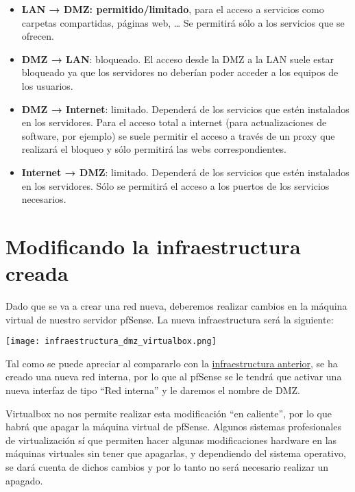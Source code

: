 \begin{itemize}
    \item \textbf{LAN → DMZ: permitido/limitado}, para el acceso a servicios como carpetas compartidas, páginas web, … Se permitirá sólo a los servicios que se ofrecen.
    \item  \textbf{DMZ → LAN}: bloqueado. El acceso desde la DMZ a la LAN suele estar bloqueado ya que los servidores no deberían poder acceder a los equipos de los usuarios.
    \item \textbf{DMZ → Internet}: limitado. Dependerá de los servicios que estén instalados en los servidores. Para el acceso total a internet (para actualizaciones de software, por ejemplo) se suele permitir el acceso a través de un proxy que realizará el bloqueo y sólo permitirá las webs correspondientes.
    \item \textbf{Internet → DMZ}: limitado. Dependerá de los servicios que estén instalados en los servidores. Sólo se permitirá el acceso a los puertos de los servicios necesarios.
\end{itemize}

\section{Modificando la infraestructura creada}

Dado que se va a crear una red nueva, deberemos realizar cambios en la máquina virtual de nuestro servidor pfSense. La nueva infraestructura será la siguiente:

\begin{center}
    \vspace{-20pt}
    \texttt{[image: infraestructura\_dmz\_virtualbox.png]}
    \vspace{-20pt}
\end{center}

Tal como se puede apreciar al compararlo con la \hyperlink{detalles_maquina_virtual}{infraestructura anterior}, se ha creado una nueva red interna, por lo que al pfSense se le tendrá que activar una nueva interfaz de tipo “Red interna” y le daremos el nombre de DMZ.

Virtualbox no nos permite realizar esta modificación “en caliente”, por lo que habrá que apagar la máquina virtual de pfSense. Algunos sistemas profesionales de virtualización sí que permiten hacer algunas modificaciones hardware en las máquinas virtuales sin tener que apagarlas, y dependiendo del sistema operativo, se dará cuenta de dichos cambios y por lo tanto no será necesario realizar un apagado.

